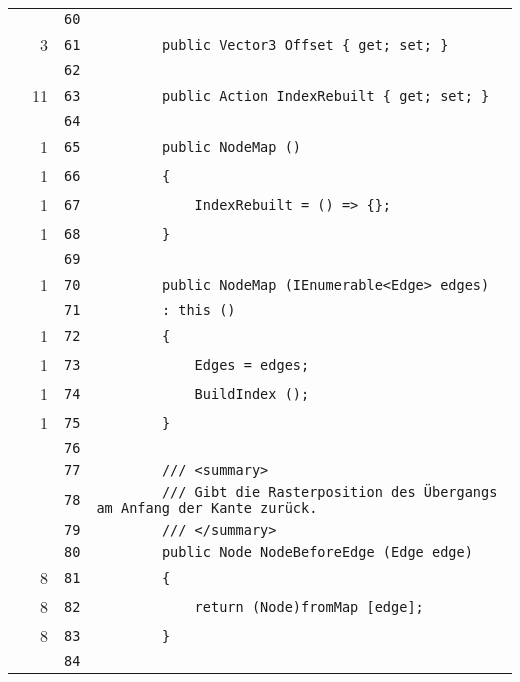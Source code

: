 \documentclass[a4paper,10pt]{article}
\begin{document}
\begin{longtable}[l]{lrrl}
\cellcolor{gray} &  & \verb~60~ & \verb~~\\
\cellcolor{green} & 3 & \verb~61~ & \verb~        public Vector3 Offset { get; set; }~\\
\cellcolor{gray} &  & \verb~62~ & \verb~~\\
\cellcolor{green} & 11 & \verb~63~ & \verb~        public Action IndexRebuilt { get; set; }~\\
\cellcolor{gray} &  & \verb~64~ & \verb~~\\
\cellcolor{green} & 1 & \verb~65~ & \verb~        public NodeMap ()~\\
\cellcolor{green} & 1 & \verb~66~ & \verb~        {~\\
\cellcolor{green} & 1 & \verb~67~ & \verb~            IndexRebuilt = () => {};~\\
\cellcolor{green} & 1 & \verb~68~ & \verb~        }~\\
\cellcolor{gray} &  & \verb~69~ & \verb~~\\
\cellcolor{green} & 1 & \verb~70~ & \verb~        public NodeMap (IEnumerable<Edge> edges)~\\
\cellcolor{gray} &  & \verb~71~ & \verb~        : this ()~\\
\cellcolor{green} & 1 & \verb~72~ & \verb~        {~\\
\cellcolor{green} & 1 & \verb~73~ & \verb~            Edges = edges;~\\
\cellcolor{green} & 1 & \verb~74~ & \verb~            BuildIndex ();~\\
\cellcolor{green} & 1 & \verb~75~ & \verb~        }~\\
\cellcolor{gray} &  & \verb~76~ & \verb~~\\
\cellcolor{gray} &  & \verb~77~ & \verb~        /// <summary>~\\
\cellcolor{gray} &  & \verb~78~ & \verb~        /// Gibt die Rasterposition des Übergangs am Anfang der Kante zurück.~\\
\cellcolor{gray} &  & \verb~79~ & \verb~        /// </summary>~\\
\cellcolor{gray} &  & \verb~80~ & \verb~        public Node NodeBeforeEdge (Edge edge)~\\
\cellcolor{green} & 8 & \verb~81~ & \verb~        {~\\
\cellcolor{green} & 8 & \verb~82~ & \verb~            return (Node)fromMap [edge];~\\
\cellcolor{green} & 8 & \verb~83~ & \verb~        }~\\
\cellcolor{gray} &  & \verb~84~ & \verb~~\\

\end{longtable}
\end{document}
